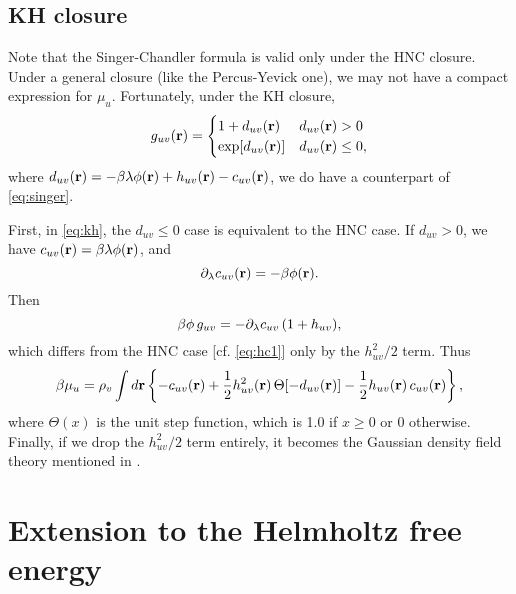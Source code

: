 \documentclass[12pt]{article}
\begin{document}
\subsection{KH closure}

Note that the Singer-Chandler formula is valid
  only under the HNC closure.
Under a general closure (like the Percus-Yevick one),
  we may not have a compact expression for $\mu_u$.
Fortunately, under the KH closure,
\begin{equation}
  g_{uv}(\mathbf{r}) =
  \begin{cases}
    1 + d_{uv}(\mathbf{r})
    & d_{uv}(\mathbf{r}) > 0
  \\
    \exp[ d_{uv}(\mathbf{r}) ]
    & d_{uv}(\mathbf{r}) \le 0,
  \end{cases}
  \label{eq:kh}
\end{equation}
where $d_{uv}(\mathbf{r}) = -\beta \lambda \phi(\mathbf{r}) + h_{uv}(\mathbf{r}) - c_{uv}(\mathbf{r})$,
we do have a counterpart of \eqref{eq:singer}.


First, in \eqref{eq:kh}, the $d_{uv} \le 0$ case is equivalent to the HNC case.
%
If $d_{uv} > 0$, we have $c_{uv}(\mathbf{r}) = \beta \lambda \phi(\mathbf{r})$, and
\[
  \partial_\lambda c_{uv}(\mathbf{r}) = -\beta \phi(\mathbf{r}).
\]
Then
\[
  \beta \phi \, g_{uv}
  = -\partial_\lambda c_{uv} \, (1 + h_{uv}),
\]
which differs from the HNC case [cf. \eqref{eq:hc1}]
  only by the $h_{uv}^2/2$ term.
Thus
%
\begin{equation}
\beta \mu_u
  =
  \rho_v \int d\mathbf{r}
  \left\{
    - c_{uv}(\mathbf{r})
    + \frac{1}{2} h_{uv}^2(\mathbf{r}) \, \Theta[ -d_{uv}(\mathbf{r}) ]
    - \frac{1}{2} h_{uv}(\mathbf{r}) \, c_{uv}(\mathbf{r})
  \right\},
  \label{eq:singer-kh}
\end{equation}
%
where $\Theta(x)$ is the unit step function,
which is 1.0 if $x \ge 0$ or 0 otherwise.
%
Finally, if we drop the $h_{uv}^2/2$ term entirely,
it becomes the Gaussian density field theory mentioned in \cite{singer}.



\section{Extension to the Helmholtz free energy}
\end{document}
